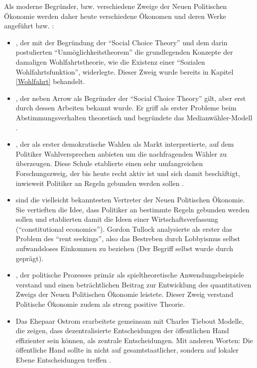 Als moderne Begründer, bzw. verschiedene Zweige der Neuen Politischen Ökonomie werden daher heute verschiedene Ökonomen und deren Werke angeführt \parencite[S. 31]{Grofman2004} bzw. \parencite{Mitchell1988}:
\begin{itemize}
	\item \textcite{Arrow1951, Arrow1950}, der mit der Begründung der "`Social Choice Theory"' und dem darin postulierten "`Unmöglichkeitstheorem"' die grundlegenden Konzepte der damaligen Wohlfahrtstheorie, wie die Existenz einer "`Sozialen Wohlfahrtsfunktion"', widerlegte. Dieser Zweig wurde bereits in Kapitel \ref{Wohlfahrt} behandelt.
	\item \textcite{Black1948a, Black1958}, der neben Arrow als Begründer der "`Social Choice Theory"' gilt, aber erst durch dessen Arbeiten bekannt wurde. Er griff als erster Probleme beim Abstimmungsverhalten theoretisch und begründete das Medianwähler-Modell \parencite{Black1948a}.
	\item \textcite{Downs1957b, Downs1957}, der als erster demokratische Wahlen als Markt interpretierte, auf dem Politiker Wahlversprechen anbieten um die nachfragenden Wähler zu überzeugen. Diese Schule etablierte einen sehr umfangreichen Forschungszweig, der bis heute recht aktiv ist und sich damit beschäftigt, inwieweit Politiker an Regeln gebunden werden sollen \parencite[S. 523]{Snowdon2005}.
	\item \textcite{Buchanan1962} sind die vielleicht bekanntesten Vertreter der Neuen Politischen Ökonomie. Sie vertieften die Idee, dass Politiker an bestimmte Regeln gebunden werden sollen und etablierten damit die Ideen einer Wirtschaftsverfassung ("`constitutional economics"'). Gordon Tullock analysierte als erster das Problem des "`rent seekings"', also das Bestreben durch Lobbyismus selbst aufwandsloses Einkommen zu beziehen (Der Begriff selbst wurde durch \textcite{Krueger1974} geprägt).
	\item \textcite{Riker1962}, der politische Prozesses primär als spieltheoretische Anwendungsbeispiele verstand und einen beträchtlichen Beitrag zur Entwicklung des quantitativen Zweigs der Neuen Politischen Ökonomie leistete. Dieser Zweig verstand Politische Ökonomie zudem als streng positive Theorie.
	\item Das Ehepaar Ostrom erarbeitete gemeinsam mit Charles Tiebout Modelle, die zeigen, dass dezentralisierte Entscheidungen der öffentlichen Hand effizienter sein können, als zentrale Entscheidungen. Mit anderen Worten: Die öffentliche Hand sollte in nicht auf gesamtstaatlicher, sondern auf lokaler Ebene Entscheidungen treffen \parencite{Ostrom1961, Ostrom1971}.
\end{itemize}

